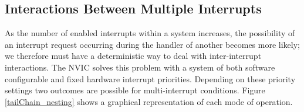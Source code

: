 \documentclass[openany,11pt,fleqn]{book} %
\makeatletter
\newcommand{\ilcode}[1]{
    \smallskip
    \colorbox{gray!20!white}{
        \centering
        \parbox{\linewidth-2\fboxsep}{
            \lstinline@#1@
        }
    }
}
\makeatother
\begin{document}


\subsection{\color{orange}Interactions Between Multiple Interrupts}
As the number of enabled interrupts within a system increases, the possibility of an interrupt request occurring during the handler of another becomes more likely; we therefore must have a deterministic way to deal with inter-interrupt interactions. The NVIC solves this problem with a system of both software configurable and fixed hardware interrupt priorities. Depending on these priority settings two outcomes are possible for multi-interrupt conditions. Figure \ref{tailChain_nesting} shows a graphical representation of each mode of operation.
\end{document}
